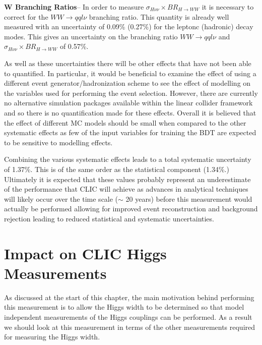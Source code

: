 \textbf{W Branching Ratios}-- In order to measure $\sigma_{H\nu\nu}\times BR_{H\rightarrow WW}$ it is necessary to correct for the $WW\rightarrow qql\nu$ branching ratio. This quantity is already well measured\cite{PDBook} with an uncertainty of 0.09\% (0.27\%) for the leptonc (hadronic) decay modes. This gives an uncertainty on the branching ratio $WW\rightarrow qql\nu$ and $\sigma_{H\nu\nu}\times BR_{H\rightarrow WW}$ of 0.57\%.

As well as these uncertainties there will be other effects that have not been able to quantified. In particular, it would be beneficial to examine the effect of using a different event generator/hadronization scheme to see the effect of modelling on the variables used for performing the event selection. However, there are currently no alternative simulation packages available within the linear collider framework and so there is no quantification made for these effects. Overall it is believed that the effect of different MC models should be small when compared to the other systematic effects as few of the input variables for training the BDT are expected to be sensitive to modelling effects.

Combining the various systematic effects leads to a total systematic uncertainty of 1.37\%. This is of the same order as the statistical component (1.34\%.) Ultimately it is expected that these values probably represent an underestimate of the performance that \ac{CLIC} will achieve as advances in analytical techniques will likely occur over the time scale ($\sim$ 20 years) before this measurement would actually be performed allowing for improved event reconstruction and background rejection leading to reduced statistical and systematic uncertainties.  

\section{Impact on CLIC Higgs Measurements}
As discussed at the start of this chapter, the main motivation behind performing this measurement is to allow the Higgs width to be determined so that model independent measurements of the Higgs couplings can be performed. As a result we should look at this measurement in terms of the other measurements required for measuring the Higgs width.

